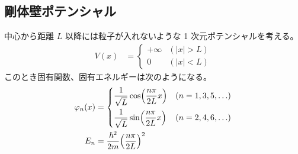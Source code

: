 \documentclass[uplatex,dvipdfmx,a4paper,11pt]{jlreq}
\numberwithin{equation}{section}
\theoremstyle{definition}
\begin{document}
\subsection{剛体壁ポテンシャル}
\begin{proposition}
  中心から距離 $L$ 以降には粒子が入れないような 1 次元ポテンシャルを考える。
  \begin{align}
    V(x) & = \begin{cases}
               + \infty & (|x| > L) \\
               0        & (|x| < L)
             \end{cases}
  \end{align}
  このとき固有関数、固有エネルギーは次のようになる。
  \begin{align}
    \varphi_n(x) & = \begin{dcases}
                       \frac{1}{\sqrt{L}}\cos(\frac{n\pi}{2L}x) & (n = 1,3,5,\ldots) \\
                       \frac{1}{\sqrt{L}}\sin(\frac{n\pi}{2L}x) & (n = 2,4,6,\ldots)
                     \end{dcases} \\
    E_n          & = \frac{\hbar^2}{2m}\qty(\frac{n\pi}{2L})^2
  \end{align}
\end{proposition}
\end{document}
